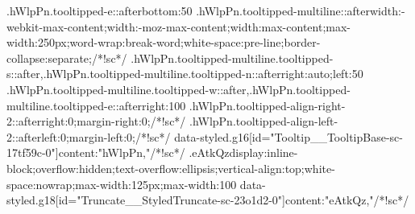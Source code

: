 {{{{{{{{{{{{{{{{{{{{{{{{{{{.hWlpPn.tooltipped-e::after{bottom:50%
.hWlpPn.tooltipped-multiline::after{width:-webkit-max-content;width:-moz-max-content;width:max-content;max-width:250px;word-wrap:break-word;white-space:pre-line;border-collapse:separate;}/*!sc*/
.hWlpPn.tooltipped-multiline.tooltipped-s::after,.hWlpPn.tooltipped-multiline.tooltipped-n::after{right:auto;left:50%
.hWlpPn.tooltipped-multiline.tooltipped-w::after,.hWlpPn.tooltipped-multiline.tooltipped-e::after{right:100%
.hWlpPn.tooltipped-align-right-2::after{right:0;margin-right:0;}/*!sc*/
.hWlpPn.tooltipped-align-left-2::after{left:0;margin-left:0;}/*!sc*/
data-styled.g16[id="Tooltip__TooltipBase-sc-17tf59c-0"]{content:"hWlpPn,"}/*!sc*/
.eAtkQz{display:inline-block;overflow:hidden;text-overflow:ellipsis;vertical-align:top;white-space:nowrap;max-width:125px;max-width:100%
data-styled.g18[id="Truncate__StyledTruncate-sc-23o1d2-0"]{content:"eAtkQz,"}/*!sc*/
}}}}}}}}}}}}}}}}}}}}}}}}}}}}}}}
